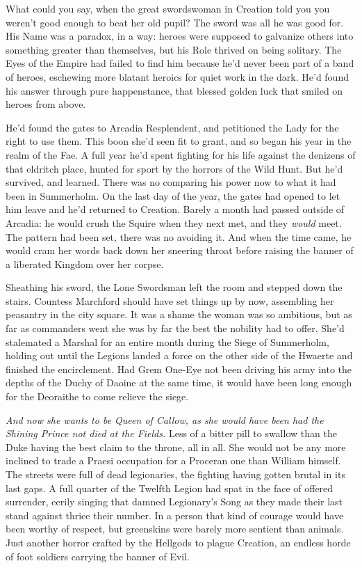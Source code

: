 \documentclass[12pt, openany]{book}
\begin{document}
What could you say, when the great swordswoman in Creation told you you weren’t good enough to beat her old pupil? The sword was all he was good for. His Name was a paradox, in a way: heroes were supposed to galvanize others into something greater than themselves, but his Role thrived on being solitary. The Eyes of the Empire had failed to find him because he’d never been part of a band of heroes, eschewing more blatant heroics for quiet work in the dark. He’d found his answer through pure happenstance, that blessed golden luck that smiled on heroes from above.

He’d found the gates to Arcadia Resplendent, and petitioned the Lady for the right to use them. This boon she’d seen fit to grant, and so began his year in the realm of the Fae. A full year he’d spent fighting for his life against the denizens of that eldritch place, hunted for sport by the horrors of the Wild Hunt. But he’d survived, and learned. There was no comparing his power now to what it had been in Summerholm. On the last day of the year, the gates had opened to let him leave and he’d returned to Creation. Barely a month had passed outside of Arcadia: he would crush the Squire when they next met, and they \textit{would }meet. The pattern had been set, there was no avoiding it. And when the time came, he would cram her words back down her sneering throat before raising the banner of a liberated Kingdom over her corpse.

Sheathing his sword, the Lone Swordsman left the room and stepped down the stairs. Countess Marchford should have set things up by now, assembling her peasantry in the city square. It was a shame the woman was so ambitious, but as far as commanders went she was by far the best the nobility had to offer. She’d stalemated a Marshal for an entire month during the Siege of Summerholm, holding out until the Legions landed a force on the other side of the Hwaerte and finished the encirclement. Had Grem One-Eye not been driving his army into the depths of the Duchy of Daoine at the same time, it would have been long enough for the Deoraithe to come relieve the siege.

\textit{And now she wants to be Queen of Callow, as she would have been had the Shining Prince not died at the Fields.} Less of a bitter pill to swallow than the Duke having the best claim to the throne, all in all. She would not be any more inclined to trade a Praesi occupation for a Proceran one than William himself. The streets were full of dead legionaries, the fighting having gotten brutal in its last gaps. A full quarter of the Twelfth Legion had spat in the face of offered surrender, eerily singing that damned Legionary’s Song as they made their last stand against thrice their number. In a person that kind of courage would have been worthy of respect, but greenskins were barely more sentient than animals. Just another horror crafted by the Hellgods to plague Creation, an endless horde of foot soldiers carrying the banner of Evil.
\end{document}
